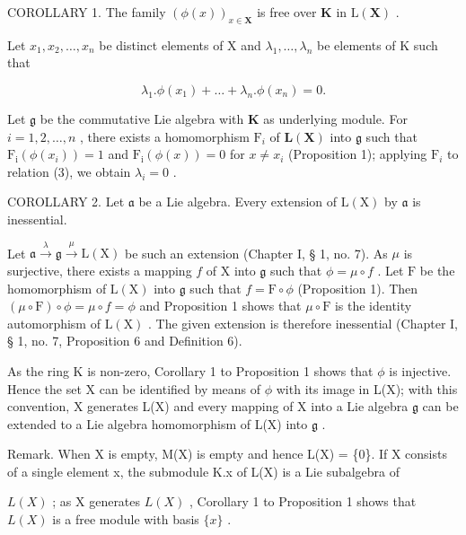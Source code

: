 COROLLARY 1. The family \((\phi (x))_{x\in \mathbf{X}}\) is free over \(\mathbf{K}\) in \(\mathrm{L}(\mathbf{X})\) .

Let \(x_{1}, x_{2}, \ldots, x_{n}\) be distinct elements of X and \(\lambda_{1}, \ldots, \lambda_{n}\) be elements of K such that

\[
\lambda_ {1}. \phi (x _ {1}) + \dots + \lambda_ {n}. \phi (x _ {n}) = 0.\tag{3}
\]

Let \(\mathfrak{g}\) be the commutative Lie algebra with \(\mathbf{K}\) as underlying module. For \(i = 1,2,\ldots ,n\) , there exists a homomorphism \(\mathrm{F}_i\) of \(\mathbf{L}(\mathbf{X})\) into \(\mathfrak{g}\) such that \(\mathrm{F_i}(\phi (x_i)) = 1\) and \(\mathrm{F_i}(\phi (x)) = 0\) for \(x\neq x_{i}\) (Proposition 1); applying \(\mathrm{F}_i\) to relation (3), we obtain \(\lambda_{i} = 0\) .

COROLLARY 2. Let \(\mathfrak{a}\) be a Lie algebra. Every extension of \(\mathrm{L}(\mathrm{X})\) by \(\mathfrak{a}\) is inessential.

Let \(\mathfrak{a} \xrightarrow{\lambda} \mathfrak{g} \xrightarrow{\mu} \mathrm{L}(\mathrm{X})\) be such an extension (Chapter I, § 1, no. 7). As \(\mu\) is surjective, there exists a mapping \(f\) of \(\mathrm{X}\) into \(\mathfrak{g}\) such that \(\phi = \mu \circ f\) . Let \(\mathrm{F}\) be the homomorphism of \(\mathrm{L}(\mathrm{X})\) into \(\mathfrak{g}\) such that \(f = \mathrm{F} \circ \phi\) (Proposition 1). Then \((\mu \circ \mathrm{F}) \circ \phi = \mu \circ f = \phi\) and Proposition 1 shows that \(\mu \circ \mathrm{F}\) is the identity automorphism of \(\mathrm{L}(\mathrm{X})\) . The given extension is therefore inessential (Chapter I, § 1, no. 7, Proposition 6 and Definition 6).

As the ring K is non-zero, Corollary 1 to Proposition 1 shows that \(\phi\) is injective. Hence the set X can be identified by means of \(\phi\) with its image in L(X); with this convention, X generates L(X) and every mapping of X into a Lie algebra \(\mathfrak{g}\) can be extended to a Lie algebra homomorphism of L(X) into \(\mathfrak{g}\) .

Remark. When X is empty, M(X) is empty and hence L(X) = \{0\}. If X consists of a single element x, the submodule K.x of L(X) is a Lie subalgebra of

\(L(X)\) ; as X generates \(L(X)\) , Corollary 1 to Proposition 1 shows that \(L(X)\) is a free module with basis \(\{x\}\) .

